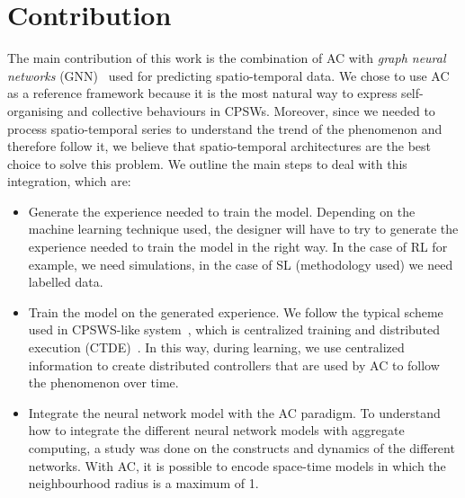 \documentclass{article}
\begin{document}
\section{Contribution}
The main contribution of this work is the combination of AC with \textit{graph neural networks} (GNN)~\cite{wu2020comprehensive} used for predicting spatio-temporal data. 
We chose to use AC as a reference framework because it is the most natural way to express self-organising and collective behaviours in CPSWs. 
Moreover, since we needed to process spatio-temporal series to understand the trend of the phenomenon and therefore follow it, we believe that spatio-temporal architectures are the best choice to solve this problem.
We outline the main steps to deal with this integration, which are:
 \begin{itemize}
\item Generate the experience needed to train the model. 
 Depending on the machine learning technique used, 
 the designer will have to try to generate the experience needed to train the model in the right way. In the case of RL for example, we need simulations, in the case of SL (methodology used) we need labelled data.
\item Train the model on the generated experience. We follow the typical scheme used in CPSWS-like system~\cite{aguzzi2021research, DBLP:conf/icdcs/AguzziCV22}, which is centralized training and distributed execution (CTDE)~\cite{foerster2016learning}. 
In this way, during learning, we use centralized information to create distributed controllers that are used by AC to 
follow the phenomenon over time.
\item Integrate the neural network model with the AC paradigm. To understand how to integrate the different neural network models with aggregate computing, a study was done on the constructs and dynamics of the different networks. With AC, it is possible to encode space-time models in which the neighbourhood radius is a maximum of 1.
\end{itemize}
\end{document}
